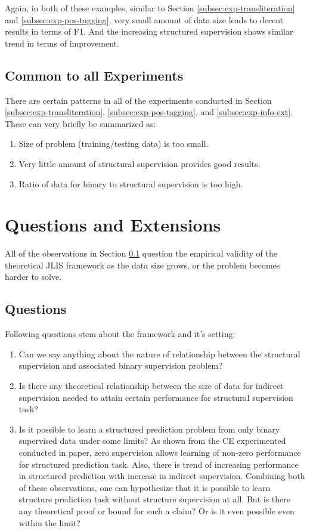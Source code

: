 \documentclass{acm_proc_article-sp}
\begin{document}
Again, in both of these examples, similar to Section \ref{subsec:exp-transliteration} and \ref{subsec:exp-pos-tagging}, very small amount of data size leads to decent results in terms of F1. And the increasing structured supervision shows similar trend in terms of improvement.


\subsection{Common to all Experiments}
\label{subsec:exp-common}
There are certain patterns in all of the experiments conducted in Section \ref{subsec:exp-transliteration}, \ref{subsec:exp-pos-tagging}, and \ref{subsec:exp-info-ext}. These can very briefly be summarized as:
\begin{enumerate}
\item Size of problem (training/testing data) is too small.
\item Very little amount of structural supervision provides good results.
\item Ratio of data for binary to structural supervision is too high.
\end{enumerate}


\section{Questions and Extensions}
\label{sec:questions-extensions}
All of the observations in Section \ref{subsec:exp-common} question the empirical validity of the theoretical JLIS framework as the data size grows, or the problem becomes harder to solve. 
\subsection{Questions}
\label{subsec:questions}
Following questions stem about the framework and it's setting:
\begin{enumerate}
\item Can we say anything about the nature of relationship between the structural supervision and associated binary supervision problem?
\item Is there any theoretical relationship between the size of data for indirect supervision needed to attain certain performance for structural supervision task?
\item Is it possible to learn a structured prediction problem from only binary supervised data under some limits? As shown from the CE experimented conducted in paper, zero supervision allows learning of non-zero performance for structured prediction task. Also, there is trend of increasing performance in structured prediction with increase in indirect supervision. Combining both of these observations, one can hypothesize that it is possible to learn structure prediction task without structure supervision at all. But is there any theoretical proof or bound for such a claim? Or is it even possible even within the limit?
\end{enumerate}
\end{document}
